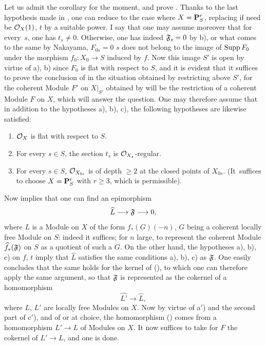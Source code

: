 Let us admit the corollary for the moment, and prove . Thanks to the last hypothesis made in , one can reduce to the case where $X={\mathbf P}^r_S$, replacing if need be $\mathcal{O}_X(1)$, $t$ by a suitable power. I say that one may assume moreover that for every~$s$, one has $t_s\neq 0$. Otherwise, one has indeed $\mathfrak{F}_s=0$ by b), or what comes to the same by Nakayama, $F_{0s}=0$ \ie $s$ does not belong to the image of $\operatorname{Supp} F_0$ under the morphism $f_0:X_0\to S$ induced by $f$. Now this image $S'$ is open by virtue of a), b) since $F_0$ is flat with respect to $S$, and it is evident that it suffices to prove the conclusion of  in the situation obtained by restricting above $S'$, for the coherent Module $F'$ on $X|_{S'}$ obtained by will be the restriction of a coherent Module $F$ on $X$, which will answer the question. One may therefore assume that in addition to the hypotheses a), b), c), the following hypotheses are likewise satisfied:
\begin{enumerate}
\item[\textup{a$'$)}] $\mathcal{O}_X$ is flat with respect to $S$.
\item[\textup{b$'$)}] For every $s\in S$, the section $t_s$ is ${\mathcal O}_{X_s}$-regular.
\item[\textup{c$'$)}] For every $s\in S$, ${\mathcal O}_{X_{0s}}$ is of depth $\geq 2$ at the closed points of $X_{0s}$. (It~suffices to choose $X={\mathbf P}_S^r$ with $r\geq 3$, which is permissible).
\end{enumerate}
Now  implies that one can find an epimorphism
\steco
\begin{equation} \label{eq:XII.17}
\widehat{L} \to \formelF \to 0,
\end{equation}
where $L$ is a Module on $X$ of the form $f_\ast(G)(-n)$, $G$ being a coherent locally free Module on $S$: indeed it suffices; for $n$ large, to represent the coherent Module $\widehat{f}_\ast(\mathfrak{F})$ on $S$ as a quotient of such a $G$. On the other hand, the hypotheses a), b), c) on $f$, $t$ imply that $\widehat{L}$ satisfies the same conditions a), b), c) as $\mathfrak{F}$. One easily concludes that the same holds for the kernel of (), to which one can therefore apply the same argument, so that $\mathfrak{F}$ is represented as the cokernel of a homomorphism
\steco
\begin{equation} \label{eq:XII.18}
\widehat{L'} \to \widehat{L},
\end{equation}
where $L$, $L'$ are locally free Modules on $X$. Now by virtue of a$'$) and the second part of c$'$), and of  or  at choice, the homomorphism () comes from a homomorphism $L'\to L$ of Modules on $X$. It now suffices to take for $F$ the cokernel of $L'\to L$, and one is done.

